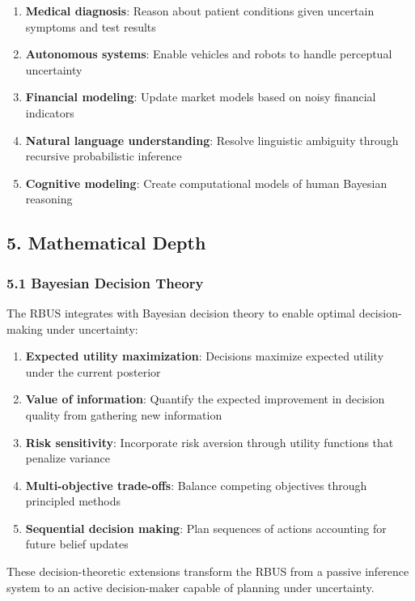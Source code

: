 \documentclass[
]{article}
\providecommand{\tightlist}{%
  \setlength{\itemsep}{0pt}\setlength{\parskip}{0pt}}
\begin{document}
\begin{enumerate}
\def\labelenumi{\arabic{enumi}.}
\tightlist
\item
  \textbf{Medical diagnosis}: Reason about patient conditions given
  uncertain symptoms and test results
\item
  \textbf{Autonomous systems}: Enable vehicles and robots to handle
  perceptual uncertainty
\item
  \textbf{Financial modeling}: Update market models based on noisy
  financial indicators
\item
  \textbf{Natural language understanding}: Resolve linguistic ambiguity
  through recursive probabilistic inference
\item
  \textbf{Cognitive modeling}: Create computational models of human
  Bayesian reasoning
\end{enumerate}

\subsection{5. Mathematical Depth}\label{mathematical-depth-1}

\subsubsection{5.1 Bayesian Decision
Theory}\label{bayesian-decision-theory}

The RBUS integrates with Bayesian decision theory to enable optimal
decision-making under uncertainty:

\begin{enumerate}
\def\labelenumi{\arabic{enumi}.}
\tightlist
\item
  \textbf{Expected utility maximization}: Decisions maximize expected
  utility under the current posterior
\item
  \textbf{Value of information}: Quantify the expected improvement in
  decision quality from gathering new information
\item
  \textbf{Risk sensitivity}: Incorporate risk aversion through utility
  functions that penalize variance
\item
  \textbf{Multi-objective trade-offs}: Balance competing objectives
  through principled methods
\item
  \textbf{Sequential decision making}: Plan sequences of actions
  accounting for future belief updates
\end{enumerate}

These decision-theoretic extensions transform the RBUS from a passive
inference system to an active decision-maker capable of planning under
uncertainty.
\end{document}
